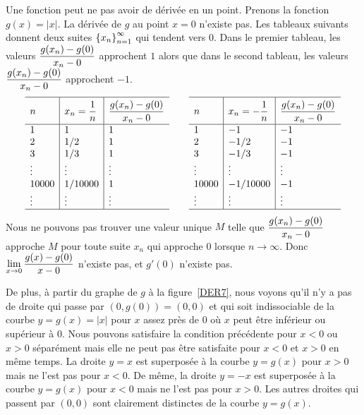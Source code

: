 {\begin{rmk}
Une fonction peut ne pas avoir de dérivée en un point.  Prenons la
fonction $g(x) = |x|$.  La dérivée de $g$ au point $x=0$ n'existe pas.
Les tableaux suivants donnent deux suites
$\displaystyle \left\{x_n\right\}_{n=1}^\infty$ qui tendent vers $0$.
Dans le premier tableau, les valeurs
$\displaystyle \frac{g(x_n)-g(0)}{x_n-0}$
approchent $1$ alors que dans le second tableau, les valeurs
$\displaystyle \frac{g(x_n)-g(0)}{x_n-0}$ approchent $-1$.
\[
\begin{array}{l|l|l}
\hline
\rule[-1em]{0ex}{2.7em} n & \DS x_n = \frac{1}{n} &
\DS \frac{g(x_n)-g(0)}{x_n-0} \\
\hline
1 & 1 & 1 \\
2 & 1/2 & 1 \\
3 & 1/3 & 1 \\
\vdots & \vdots & \vdots \\
10000 & 1/10000 & 1 \\
\vdots & \vdots & \vdots \\
\hline
\end{array}
\qquad
\begin{array}{l|l|l}
\hline
\rule[-1em]{0ex}{2.7em} n & \DS x_n = -\frac{1}{n} &
\DS \frac{g(x_n)-g(0)}{x_n-0} \\
\hline
1 & -1 & -1 \\
2 & -1/2 & -1 \\
3 & -1/3 & -1 \\
\vdots & \vdots & \vdots \\
10000 & -1/10000 & -1 \\
\vdots & \vdots & \vdots \\
\hline
\end{array}
\]
Nous ne pouvons pas trouver une valeur unique $M$ telle que
$\displaystyle \frac{g(x_n)-g(0)}{x_n-0}$ approche $M$ pour toute
suite $x_n$ qui approche $0$ lorsque $n \to \infty$.  Donc
$\displaystyle \lim_{x\rightarrow 0} \frac{g(x)-g(0)}{x-0}$ n'existe 
pas, et $g'(0)$ n'existe pas.

De plus, à partir du graphe de $g$ à la figure~\ref{DER7}, nous voyons
qu'il n'y a pas de droite qui passe par $(0,g(0))=(0,0)$ et qui soit
indissociable de la courbe $y=g(x)=|x|$ pour $x$ assez près de $0$ où
$x$ peut être inférieur ou supérieur à $0$.  Nous pouvons satisfaire la
condition précédente pour $x<0$ ou $x>0$ séparément mais elle ne peut
pas être satisfaite pour $x<0$ et $x>0$ en même temps.  La droite
$y=x$ est superposée à la courbe $y=g(x)$ pour $x>0$ mais ne l'est pas
pour $x<0$.  De même, la droite $y=-x$ est superposée à la courbe
$y=g(x)$ pour $x<0$ mais ne l'est pas pour $x>0$.  Les autres droites
qui passent par $(0,0)$ sont clairement distinctes de la courbe
$y=g(x)$.
\end{rmk}

}

